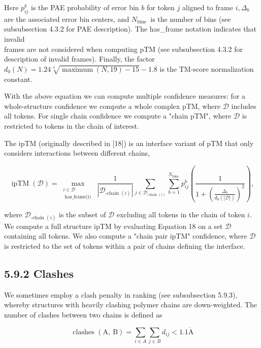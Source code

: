 \documentclass[10pt]{article}
\def\AA{\mathring{\mathrm{A}}}
\begin{document}
Here $p_{i j}^{b}$ is the PAE probability of error bin $b$ for token $j$ aligned to frame $i, \Delta_{b}$ are the associated error bin centers, and $N_{\text {bins }}$ is the number of bins (see subsubsection 4.3.2 for PAE description). The has\_frame notation indicates that invalid\\
frames are not considered when computing pTM (see subsubsection 4.3.2 for description of invalid frames). Finally, the factor $d_{0}(N)=1.24 \sqrt[3]{\operatorname{maximum}(N, 19)-15}-1.8$ is the TM-score normalization constant.

With the above equation we can compute multiple confidence measures: for a whole-structure confidence we compute a whole complex pTM, where $\mathcal{D}$ includes all tokens. For single chain confidence we compute a "chain pTM", where $\mathcal{D}$ is restricted to tokens in the chain of interest.

The ipTM (originally described in [18]) is an interface variant of pTM that only considers interactions between different chains,


\begin{equation*}
\operatorname{ipTM}(\mathcal{D})=\max _{\substack{i \in \mathcal{D} \\ \text { has_frame(i) }}} \frac{1}{\left|\mathcal{D}_{\text {-chain }(i)}\right|} \sum_{j \in \mathcal{D}_{\text {-chain }(i)}} \sum_{b=1}^{N_{\text {bins }}} p_{i j}^{b}\left(\frac{1}{1+\left(\frac{\Delta_{b}}{d_{0}(|\mathcal{D}|)}\right)^{2}}\right), \tag{18}
\end{equation*}


where $\mathcal{D}_{\text {-chain }(i)}$ is the subset of $\mathcal{D}$ excluding all tokens in the chain of token $i$. We compute a full structure ipTM by evaluating Equation 18 on a set $\mathcal{D}$ containing all tokens. We also compute a "chain pair ipTM" confidence, where $\mathcal{D}$ is restricted to the set of tokens within a pair of chains defining the interface.

\subsection*{5.9.2 Clashes}
We sometimes employ a clash penalty in ranking (see subsubsection 5.9.3), whereby structures with heavily clashing polymer chains are down-weighted. The number of clashes between two chains is defined as

$$
\text { clashes }(\mathrm{A}, \mathrm{~B})=\sum_{i \in A} \sum_{j \in B} d_{i j}<1.1 \AA
$$
\end{document}
